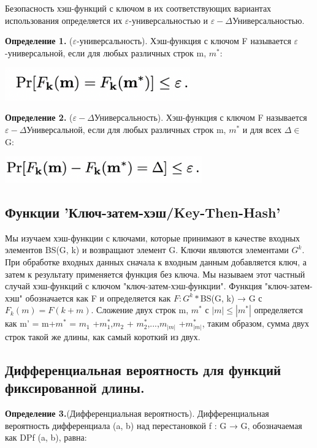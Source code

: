 \documentclass[utf8,14pt,a4paper,oneside,russian]{book}
\begin{document}
Безопасность хэш-функций с ключом в их соответствующих вариантах 
использования определяется их $\varepsilon$-универсальностью и 
$\varepsilon-\Delta$Универсальностью.

\textbf{Определение 1.} ($\varepsilon$-универсальность). Хэш-функция с ключом F 
называется $\varepsilon$-универсальной, если для любых 
различных строк m, $m^*$:

\includegraphics[width=8cm]{form2}

\textbf{Определение 2.} ($\varepsilon-\Delta$Универсальность). Хэш-функция с ключом F 
называется $\varepsilon-\Delta$Универсальной, если для любых различных 
строк m, $m^*$ и для всех $\Delta \in$ G:

\includegraphics[width=8.5cm]{form3}

\subsection{Функции 'Ключ-затем-хэш/Key-Then-Hash'}

Мы изучаем хэш-функции с ключами, которые принимают в качестве входных 
элементов BS(G, k) и возвращают элемент G. Ключи являются элементами $G^k$. 
При обработке входных данных сначала к входным данным добавляется ключ, 
а затем к результату применяется функция без ключа. Мы называем этот 
частный случай хэш-функций с ключом "ключ-затем-хэш-функции". Функция 
"ключ-затем-хэш" обозначается как F и определяется как $F: G^k * $BS(G, k) → G 
с $F_k(m) = F (k + m)$. Сложение двух строк m, $m^*$ с $|m| \le |m^*|$ определяется 
как m' = m+$m^*$ = $m_1$ +$m^*_1$,$m_2$ + $m^*_2$,...,$m_{|m|}$ +$m^*_{|m|}$, таким образом, сумма 
двух строк такой же длины, как самый короткий из двух.

\subsection{Дифференциальная вероятность для функций фиксированной длины.}

\textbf{Определение 3.}(Дифференциальная вероятность). Дифференциальная вероятность 
дифференциала (a, b) над перестановкой f : G → G, 
обозначаемая как DPf (a, b), равна:
\end{document}
